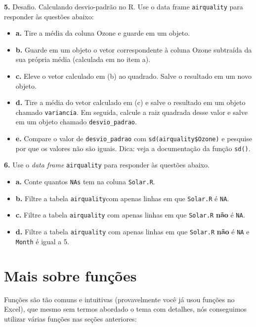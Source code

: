\documentclass[
]{book}
\begin{document}
\textbf{5.} Desafio. Calculando desvio-padrão no R. Use o data frame \texttt{airquality} para responder às questões abaixo:

\begin{itemize}
\item
  \textbf{a.} Tire a média da coluna Ozone e guarde em um objeto.
\item
  \textbf{b.} Guarde em um objeto o vetor correspondente à coluna Ozone subtraída da sua própria média (calculada em no item a).
\item
  \textbf{c.} Eleve o vetor calculado em (b) ao quadrado. Salve o resultado em um novo objeto.
\item
  \textbf{d.} Tire a média do vetor calculado em (c) e salve o resultado em um objeto chamado \texttt{variancia}. Em seguida, calcule a raiz quadrada desse valor e salve em um objeto chamado \texttt{desvio\_padrao}.
\item
  \textbf{e.} Compare o valor de \texttt{desvio\_padrao} com \texttt{sd(airquality\$Ozone)} e pesquise por que os valores não são iguais. Dica: veja a documentação da função \texttt{sd()}.
\end{itemize}

\textbf{6.} Use o \emph{data frame} \texttt{airquality} para responder às questões abaixo.

\begin{itemize}
\item
  \textbf{a.} Conte quantos \texttt{NAs} tem na coluna \texttt{Solar.R}.
\item
  \textbf{b.} Filtre a tabela \texttt{airquality}com apenas linhas em que \texttt{Solar.R} é \texttt{NA}.
\item
  \textbf{c.} Filtre a tabela \texttt{airquality} com apenas linhas em que \texttt{Solar.R} \textbf{não} é \texttt{NA}.
\item
  \textbf{d.} Filtre a tabela \texttt{airquality} com apenas linhas em que \texttt{Solar.R} \textbf{não} é \texttt{NA} e \texttt{Month} é igual a 5.
\end{itemize}

\hypertarget{maisFuncoes}{%
\section{Mais sobre funções}\label{maisFuncoes}}

Funções são tão comuns e intuitivas (provavelmente você já usou funções no Excel), que mesmo sem termos abordado o tema com detalhes, nós conseguimos utilizar várias funções nas seções anteriores:
\end{document}
